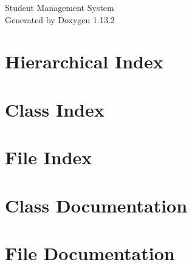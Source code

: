 \documentclass[twoside]{book}
\newcommand{\+}{\discretionary{\mbox{\scriptsize$\hookleftarrow$}}{}{}}
\newcommand{\clearemptydoublepage}{%
    \newpage{\pagestyle{empty}\cleardoublepage}%
  }
\begin{document}
  \raggedbottom
    \hypersetup{pageanchor=false,
                bookmarksnumbered=true,
                pdfencoding=unicode
               }
  \begin{titlepage}
  \vspace*{7cm}
  \begin{center}%
  {\Large Student Management System}\\
  \vspace*{1cm}
  {\large Generated by Doxygen 1.13.2}\\
  \end{center}
  \end{titlepage}
  \clearemptydoublepage
  \tableofcontents
  \clearemptydoublepage
  \hypersetup{pageanchor=true}
\chapter{Hierarchical Index}

\chapter{Class Index}

\chapter{File Index}

\chapter{Class Documentation}






\chapter{File Documentation}














  \backmatter
  \newpage
  \clearemptydoublepage
  \printindex
\end{document}
